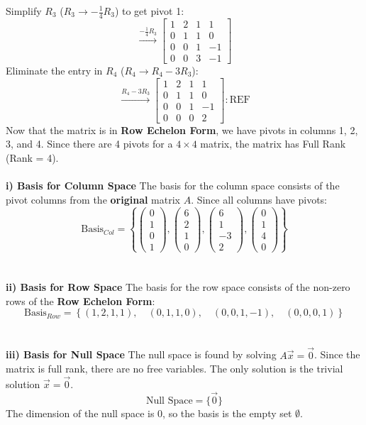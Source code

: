 \documentclass{article}
\begin{document}
Simplify $R_{3}$ ($R_{3} \to -\frac{1}{4}R_{3}$) to get pivot 1:
\[
	\xrightarrow{-\frac{1}{4}R_{3}}
	\begin{bmatrix}
		1 & 2 & 1 & 1  \\
		0 & 1 & 1 & 0  \\
		0 & 0 & 1 & -1 \\
		0 & 0 & 3 & -1
	\end{bmatrix}
\]
Eliminate the entry in $R_{4}$ ($R_{4} \to R_{4} - 3R_{3}$):
\[
	\xrightarrow{R_{4} - 3R_{3}}
	\begin{bmatrix}
		1 & 2 & 1 & 1  \\
		0 & 1 & 1 & 0  \\
		0 & 0 & 1 & -1 \\
		0 & 0 & 0 & 2
	\end{bmatrix}: \text{REF}
\]
Now that the matrix is in \textbf{Row Echelon Form}, we have pivots in columns
1, 2, 3, and 4. Since there are 4 pivots for a $4 \times 4$ matrix, the matrix
has Full Rank (Rank = 4).
\\
\\
\textbf{i) Basis for Column Space}
The basis for the column space consists of the pivot columns from the \textbf{original} matrix $A$. Since all columns have pivots:
\[
	\text{Basis}_{Col} = \left\{
	\begin{pmatrix} 0 \\ 1 \\ 0 \\ 1 \end{pmatrix},
	\begin{pmatrix} 6 \\ 2 \\ 1 \\ 0 \end{pmatrix},
	\begin{pmatrix} 6 \\ 1 \\ -3 \\ 2 \end{pmatrix},
	\begin{pmatrix} 0 \\ 1 \\ 4 \\ 0 \end{pmatrix}
	\right\}
\]
\\
\\
\textbf{ii) Basis for Row Space}
The basis for the row space consists of the non-zero rows of the \textbf{Row Echelon Form}:
\[
	\text{Basis}_{Row} = \left\{
	(1, 2, 1, 1), \quad
	(0, 1, 1, 0), \quad
	(0, 0, 1, -1), \quad
	(0, 0, 0, 1)
	\right\}
\]
\\
\\
\textbf{iii) Basis for Null Space}
The null space is found by solving $A\vec{x} = \vec{0}$.
Since the matrix is full rank, there are no free variables. The only solution is the trivial solution $\vec{x} = \vec{0}$.
\[
	\text{Null Space} = \{ \vec{0} \}
\]
The dimension of the null space is 0, so the basis is the empty set $\emptyset$.
\end{document}
